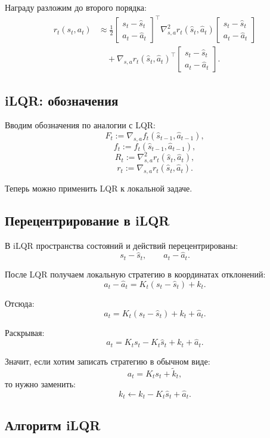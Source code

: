 \documentclass[12pt,a4paper]{article}
\begin{document}
Награду разложим до второго порядка:
\[
\begin{aligned}
r_t(s_t,a_t)
&\approx
\frac{1}{2}
\begin{bmatrix}
s_t-\hat s_t\\
a_t-\hat a_t
\end{bmatrix}^{\top}
\nabla_{s,a}^{2}r_t(\hat s_t,\hat a_t)
\begin{bmatrix}
s_t-\hat s_t\\
a_t-\hat a_t
\end{bmatrix}
\\
&\quad+
\nabla_{s,a}r_t(\hat s_t,\hat a_t)^\top
\begin{bmatrix}
s_t-\hat s_t\\
a_t-\hat a_t
\end{bmatrix}.
\end{aligned}
\]

\subsection{iLQR: обозначения}

Вводим обозначения по аналогии с LQR:
\[
F_t
:=
\nabla_{s,a}f_t(\hat s_{t-1},\hat a_{t-1}),
\]
\[
f_t
:=
f_t(\hat s_{t-1},\hat a_{t-1}),
\]
\[
R_t
:=
\nabla_{s,a}^{2}r_t(\hat s_t,\hat a_t),
\]
\[
r_t
:=
\nabla_{s,a}r_t(\hat s_t,\hat a_t).
\]

Теперь можно применить LQR к локальной задаче.

\subsection{Перецентрирование в iLQR}

В iLQR пространства состояний и действий перецентрированы:
\[
s_t-\hat s_t,
\qquad
a_t-\hat a_t.
\]

После LQR получаем локальную стратегию в координатах отклонений:
\[
a_t-\hat a_t
=
K_t(s_t-\hat s_t)+k_t.
\]

Отсюда:
\[
a_t
=
K_t(s_t-\hat s_t)+k_t+\hat a_t.
\]

Раскрывая:
\[
a_t
=
K_ts_t
-
K_t\hat s_t
+
k_t
+
\hat a_t.
\]

Значит, если хотим записать стратегию в обычном виде:
\[
a_t=K_ts_t+\tilde k_t,
\]
то нужно заменить:
\[
k_t
\leftarrow
k_t-K_t\hat s_t+\hat a_t.
\]

\subsection{Алгоритм iLQR}
\end{document}
